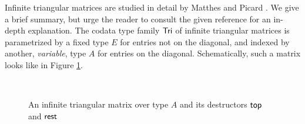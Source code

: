 \documentclass[a4paper,USenglish]{lipics}
\begin{document}
\begin{example}\label{ex_tri}
Infinite triangular matrices are studied in detail by Matthes and Picard \cite{DBLP:conf/types/MatthesP11}.
 We give a brief summary, but urge the reader to consult the given reference 
 for an in-depth explanation. 
 The codata type family $\mathsf{Tri}$ of infinite triangular matrices 
 is parametrized by a fixed type $E$ for entries not on the diagonal, 
 and indexed by another, \emph{variable}, type $A$ for entries on 
 the diagonal. 
 Schematically, such a matrix looks like in Figure \ref{fig_tri}.
 \begin{figure}[hbt]
 \centering
 \\[-2ex]
  \caption{An infinite triangular matrix over type $A$ and its destructors $\mathsf{top}$ and $\mathsf{rest}$}\label{fig_tri}
 \end{figure}


\end{example}
\end{document}
